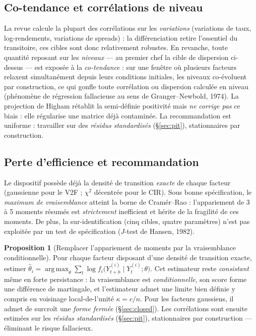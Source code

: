 \documentclass[11pt,a4paper]{article}
\theoremstyle{definition}
\newtheorem{proposition}{Proposition}
\DeclareMathOperator*{\argmax}{arg\,max}
\begin{document}
\subsection{Co-tendance et corrélations de niveau}

La revue calcule la plupart des corrélations sur les \emph{variations} (variations de taux, log-rendements, variations de spreads) : la différenciation retire l'essentiel du transitoire, ces cibles sont donc relativement robustes. En revanche, toute quantité reposant sur les \emph{niveaux} --- au premier chef la cible de dispersion ci-dessus --- est exposée à la \emph{co-tendance} : sur une fenêtre où plusieurs facteurs relaxent simultanément depuis leurs conditions initiales, les niveaux co-évoluent par construction, ce qui gonfle toute corrélation ou dispersion calculée en niveau (phénomène de régression fallacieuse au sens de Granger--Newbold, 1974). La projection de Higham rétablit la semi-définie positivité mais \emph{ne corrige pas} ce biais : elle régularise une matrice déjà contaminée. La recommandation est uniforme : travailler sur des \emph{résidus standardisés} (\S\ref{sec:pit}), stationnaires par construction.

\subsection{Perte d'efficience et recommandation}

Le dispositif possède déjà la densité de transition \emph{exacte} de chaque facteur (gaussienne pour le V2F ; $\chi^2$ décentrée pour le CIR). Sous bonne spécification, le \emph{maximum de vraisemblance} atteint la borne de Cramér--Rao : l'appariement de 3 à 5 moments résumés est \emph{strictement} inefficient et hérite de la fragilité de ces moments. De plus, la sur-identification (cinq cibles, quatre paramètres) n'est pas exploitée par un test de spécification ($J$-test de Hansen, 1982).

\begin{proposition}[Remplacer l'appariement de moments par la vraisemblance conditionnelle]
\label{prop:mle1}
Pour chaque facteur disposant d'une densité de transition exacte, estimer
$\hat\theta_i=\argmax_\theta\sum_t\log f_i\big(Y^{(i)}_{t+h}\mid Y^{(i)}_t;\theta\big)$.
Cet estimateur reste \emph{consistant} même en forte persistance : la vraisemblance est \emph{conditionnelle}, son score forme une différence de martingale, et l'estimateur admet une limite bien définie y compris en voisinage local-de-l'unité $\kappa=c/n$. Pour les facteurs gaussiens, il admet de surcroît une \emph{forme fermée} (\S\ref{sec:closed}). Les corrélations sont ensuite estimées sur les \emph{résidus standardisés} (\S\ref{sec:pit}), stationnaires par construction --- éliminant le risque fallacieux.
\end{proposition}
\end{document}

